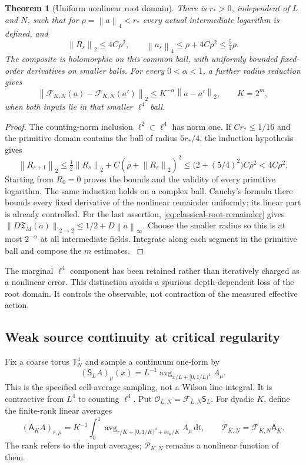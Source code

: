 \documentclass[11pt,oneside,openany]{book}
\newtheorem{theorem}{Theorem}[chapter]
\theoremstyle{definition}
\theoremstyle{remark}
\newcommand{\T}{\mathbb T}
\newcommand{\dd}{\mathrm d}
\newcommand{\norm}[1]{\left\lVert#1\right\rVert}
\newcommand{\src}[2]{\cite[#2]{#1}}
\begin{document}
\begin{theorem}[Uniform nonlinear root domain]
\label{thm:classical-root-domain}
There is $r_*>0$, independent of $L$ and $N$, such that for
$\rho=\norm a_4<r_*$ every actual intermediate logarithm is defined,
and
\begin{equation}
 \norm{R_s}_2\le4C\rho^2,\qquad
 \norm{a_s}_4\le\rho+4C\rho^2\le\tfrac54\rho.
 \label{eq:classical-root-domain}
\end{equation}
The composite is holomorphic on this common ball, with uniformly
bounded fixed-order derivatives on smaller balls. For every
$0<\alpha<1$, a further radius reduction gives
\begin{equation}
 \norm{\mathcal F_{K,N}(a)-\mathcal F_{K,N}(a')}_2
             \le K^{-\alpha}\norm{a-a'}_2,
 \qquad K=2^m,
 \label{eq:classical-error-contraction}
\end{equation}
when both inputs lie in that smaller $\ell^4$ ball.
\end{theorem}
\begin{proof}
The counting-norm inclusion $\ell^2\subset\ell^4$ has norm one.
If $Cr_*\le1/16$ and the primitive domain contains the ball of
radius $5r_*/4$, the induction hypothesis gives
\[
 \norm{R_{s+1}}_2\le\tfrac12\norm{R_s}_2
                     +C(\rho+\norm{R_s}_2)^2
 \le\bigl(2+(5/4)^2\bigr)C\rho^2<4C\rho^2.
\]
Starting from $R_0=0$ proves the bounds and the validity of every
primitive logarithm. The same induction holds on a complex ball.
Cauchy's formula there bounds every fixed derivative of the
nonlinear remainder uniformly; its linear part is already controlled.
For the last assertion, \cref{eq:classical-root-remainder} gives
$\norm{D\mathfrak T_M(a)}_{2\to2}\le1/2+D\norm a_\infty$.
Choose the smaller radius so this is at most $2^{-\alpha}$ at all
intermediate fields. Integrate along each segment in the primitive
ball and compose the $m$ estimates. \src{SM}{V12--V13}
\end{proof}

The marginal $\ell^4$ component has been retained rather than
iteratively charged as a nonlinear error. This distinction avoids a
spurious depth-dependent loss of the root domain. It controls the
observable, not contraction of the measured effective action.

\subsection{Weak source continuity at critical regularity}
Fix a coarse torus $\T_N^4$ and sample a continuum one-form by
\[
 (\mathsf S_LA)_\mu(x)=L^{-1}
       \operatorname{avg}_{x/L+[0,1/L)^4}A_\mu.
\]
This is the specified cell-average sampling, not a Wilson line
integral. It is contractive from $L^4$ to counting $\ell^4$.
Put $\mathcal O_{L,N}=\mathcal F_{L,N}\mathsf S_L$.
For dyadic $K$, define the finite-rank linear averages
\[
 (\mathsf A_KA)_{r,\mu}=K^{-1}\int_0^1
   \operatorname{avg}_{r/K+[0,1/K)^4+t e_\mu/K}A_\mu\,\dd t,
 \qquad \mathcal P_{K,N}=\mathcal F_{K,N}\mathsf A_K.
\]
The rank refers to the input averages; $\mathcal P_{K,N}$ remains a
nonlinear function of them.
\end{document}
